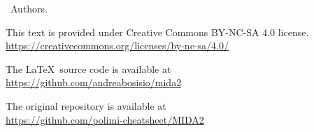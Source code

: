 \textcopyright \ Authors.

This text is provided under Creative Commons BY-NC-SA 4.0 license.\\
\url{https://creativecommons.org/licenses/by-nc-sa/4.0/}

The \LaTeX \ source code is available at\\
\url{https://github.com/andreabosisio/mida2}

The original repository is available at\\
\url{https://github.com/polimi-cheatsheet/MIDA2}